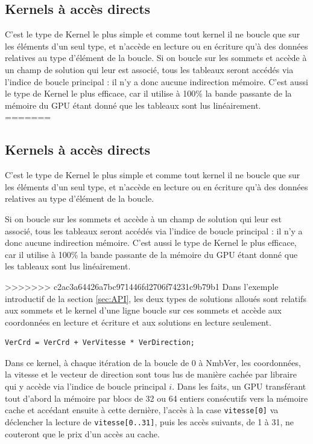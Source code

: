 \documentclass[a4paper,12pt]{article}
\begin{document}
\subsection{Kernels à accès directs}
\label{sec:kernels_directs}
C'est le type de Kernel le plus simple et comme tout kernel il ne boucle que sur les éléments d'un seul type, et n'accède en lecture ou en écriture qu'à des données relatives au type d'élément de la boucle.
Si on boucle sur les sommets et accède à un champ de solution qui leur est associé, tous les tableaux seront accédés via l'indice de boucle principal : il n'y a donc aucune indirection mémoire.
C'est aussi le type de Kernel le plus efficace, car il utilise à 100\% la bande passante de la mémoire du GPU étant donné que les tableaux sont lus linéairement.
=======

\subsection{Kernels à accès directs}
\label{sec:kernels_directs}
C'est le type de Kernel le plus simple et comme tout kernel il ne boucle que sur les éléments d'un seul type, et n'accède en lecture ou en écriture qu'à des données relatives au type d'élément de la boucle.

Si on boucle sur les sommets et accède à un champ de solution qui leur est associé, tous les tableaux seront accédés via l'indice de boucle principal : il n'y a donc aucune indirection mémoire.
C'est aussi le type de Kernel le plus efficace, car il utilise à 100\% la bande passante de la mémoire du GPU étant donné que les tableaux sont lus linéairement.

>>>>>>> c2ac3a64426a7bc971446fd2706f74231c9b79b1
Dans l'exemple introductif de la section \ref{sec:API}, les deux types de solutions alloués sont relatifs aux sommets et le kernel d'une ligne boucle sur ces sommets et accède aux coordonnées en lecture et écriture et aux solutions en lecture seulement.

\begin{tt}
\begin{verbatim}
VerCrd = VerCrd + VerVitesse * VerDirection;
\end{verbatim}
\end{tt}
\normalfont

Dans ce kernel, à chaque itération de la boucle de 0 à NmbVer, les coordonnées, la vitesse et le vecteur de direction sont tous lus de manière cachée par libraire qui y accède via l'indice de boucle principal $i$.
Dans les faits, un GPU transférant tout d'abord la mémoire par blocs de 32 ou 64 entiers consécutifs vers la mémoire cache et accédant ensuite à cette dernière, l'accès à la case {\tt vitesse[0]} va déclencher la lecture de {\tt vitesse[0..31]}, puis les accès suivants, de 1 à 31, ne couteront que le prix d'un accès au cache.
\end{document}

